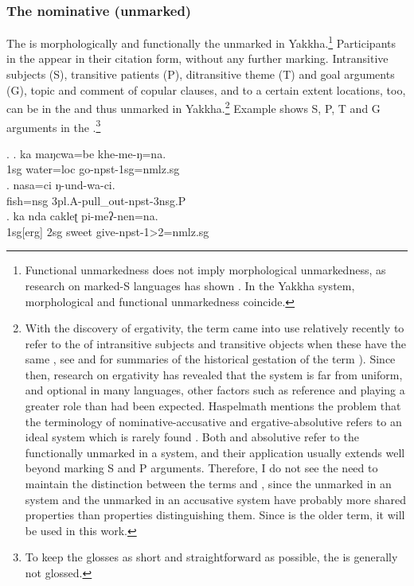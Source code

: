\subsubsection{The nominative (unmarked)}\label{case-nom}

The  is  morphologically and functionally the unmarked  in Yakkha.\footnote{Functional unmarkedness does not imply morphological unmarkedness, as research on marked-S languages has shown \citep{Handschuh2011_thesis, Brown2001_Nias}. In the Yakkha  system, morphological and functional unmarkedness coincide.} Participants in the  appear in their citation form, without any further marking. Intransitive subjects (S), transitive patients (P), ditransitive theme  (T) and goal arguments  (G), topic and comment of copular clauses, and to a certain extent locations, too, can be in the  and thus unmarked in Yakkha.\footnote{With the discovery of ergativity, the term  came into use relatively recently to refer to the  of intransitive subjects and transitive objects when these have the same , see \citet{McGregor2009_Ergativity} and \citet{Haspelmath2009_Terminology} for summaries of the historical gestation of the term ). Since then, research on ergativity has revealed that the system is far from uniform, and optional in many languages, other factors such as reference and  playing a greater role than had been expected. Haspelmath mentions the problem that the terminology of nominative-accusative and ergative-absolutive refers to an ideal system which is rarely found \citep[513]{Haspelmath2009_Terminology}. Both  and absolutive refer to the functionally unmarked  in a system, and their application usually extends well beyond marking S and P arguments. Therefore, I do not see the need to maintain the distinction between the terms  and , since the unmarked  in an  system and the unmarked  in an accusative system have probably more shared properties than properties distinguishing them. Since  is the older term, it will be used in this work.} Example  \Next shows S, P, T and G arguments in the .\footnote{To keep the glosses as short and straightforward as possible, the  is generally not glossed.} 


\ex. \ag. ka maŋcwa=be khe-me-ŋ=na.\\
			{\sc 1sg} water{\sc =loc} go{\sc -npst-1sg=nmlz.sg}\\
	\bg. nasa=ci  ŋ-und-wa-ci.\\
		fish{\sc =nsg} {\sc 3pl.A-}pull\_out{\sc -npst-3nsg.P}\\
	 \bg. ka nda cakleʈ pi-meʔ-nen=na.\\
		{\sc  1sg[erg]} {\sc 2sg} sweet give{\sc -npst-1>2=nmlz.sg}\\
			

